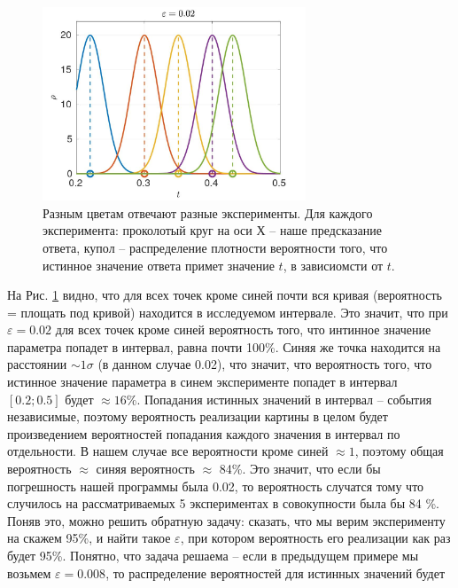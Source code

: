 \documentclass[a4paper,12pt]{article} %
\begin{document}
\begin{figure}[h!]
\begin{center}
\includegraphics[width=0.7\textwidth]{./pics/peaks_med}
\end{center}
\caption{Разным цветам отвечают разные эксперименты. Для каждого эксперимента: проколотый круг на оси Х -- наше предсказание ответа, купол -- распределение плотности вероятности того, что истинное значение ответа примет значение $t$, в зависиомсти от $t$.} \label{img:peaks_med}
\end{figure}

На Рис. \ref{img:peaks_med} видно, что для всех точек кроме синей почти вся кривая (вероятность = площать под кривой) находится в исследуемом интервале. Это значит, что при $\varepsilon = 0.02$ для всех точек кроме синей вероятность того, что интинное значение параметра попадет в интервал, равна почти 100\%. Синяя же точка находится на расстоянии $\sim 1 \sigma$ (в данном случае 0.02), что значит, что вероятность того, что истинное значение параметра в синем эксперименте попадет в интервал $[0.2; 0.5]$ будет $\approx 16 \%$. Попадания истинных значений в интервал -- события независимые, поэтому вероятность реализации картины в целом будет произведением вероятностей попадания каждого значения в интервал по отдельности. В нашем случае все вероятности кроме синей $\approx 1$, поэтому общая вероятность $\approx$ синяя вероятность $\approx$ 84\%. Это значит, что если бы погрешность нашей программы была 0.02, то вероятность случатся тому что случилось на рассматриваемых 5 экспериментах в совокупности была бы 84 \%. Поняв это, можно решить обратную задачу: сказать, что мы верим эксперименту на скажем 95\%, и найти такое $\varepsilon$, при котором вероятность его реализации как раз будет 95\%. Понятно, что задача решаема -- если в предыдущем примере мы возьмем $\varepsilon = 0.008$, то распределение вероятностей для истинных значений будет 
\end{document}

